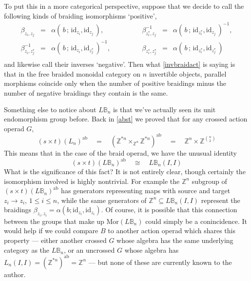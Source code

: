 \documentclass{amsbook} %
\numberwithin{section}{chapter}
\begin{document}
To put this in a more categorical perspective, suppose that we decide to call the following kinds of braiding isomorphisms `positive',
\[ \begin{array}{rllcrll}
			\beta_{z_i, z_j} & = & \alpha( \, b \, ; \, \mathrm{id}_{z_i}, \mathrm{id}_{z_j} \, ), & \quad \quad \quad & \beta_{z_i^*, z_j}^{-1} & = & \alpha( \, b \, ; \, \mathrm{id}_{z_i^*}, \mathrm{id}_{z_j} \, )^{-1}, \\
			\beta_{z_i, z_j^*}^{-1} & = & \alpha( \, b \, ; \, \mathrm{id}_{z_i}, \mathrm{id}_{z_j^*} \, )^{-1}, & \quad \quad \quad & \beta_{z_i^*, z_j^*} & = & \alpha( \, b \, ; \, \mathrm{id}_{z_i^*}, \mathrm{id}_{z_j^*} \, ) \\
		\end{array}
\]
and likewise call their inverses `negative'. Then what \cref{invbraidact} is saying is that in the free braided monoidal category on $n$ invertible objects, parallel morphisms coincide only when the number of positive braidings minus the number of negative braidings they contain is the same.

Something else to notice about $L\mathbb{B}_n$ is that we've actually seen its unit endomorphism group before. Back in \cref{abst} we proved that for any crossed action operad $G$,
\[ (s \times t)(L_n)^{\mathrm{ab}} \quad = \quad (\mathbb{Z}^{\ast n} \times_{\mathbb{Z}^n} \mathbb{Z}^{\ast n})^{\mathrm{ab}} \quad = \quad \mathbb{Z}^n \times {\mathbb{Z}}^{{n}\choose{2}} \]
This means that in the case of the braid operad, we have the unusual identity
\[ (s \times t)(L\mathbb{B}_n)^{\mathrm{ab}} \quad \cong \quad L\mathbb{B}_n(I,I) \]
What is the significance of this fact? It is not entirely clear, though certainly the isomorphism involved is highly nontrivial. For example the $\mathbb{Z}^n$ subgroup of $(s \times t)(L\mathbb{B}_n)^{\mathrm{ab}}$ has generators representing maps with source and target $z_i \to z_i$, $1 \le i \le n$, while the same generators of $\mathbb{Z}^n \subseteq L\mathbb{B}_n(I,I)$ represent the braidings $\beta_{z_i, z_i} = \alpha( b;\mathrm{id}_{z_i}, \mathrm{id}_{z_i})$. Of course, it is possible that this connection between the groups that make up $\mathrm{Mor}(L\mathbb{B}_n)$ could simply be a conincidence. It would help if we could compare $B$ to another action operad which shares this property --- either another crossed $G$ whose algebra has the same underlying category as the $L\mathbb{B}_n$, or an uncrossed $G$ whose algebra has $L_n(I,I) = (\mathbb{Z}^{\ast n})^{\mathrm{ab}} = \mathbb{Z}^{n}$ --- but none of these are currently known to the author.
\end{document}
